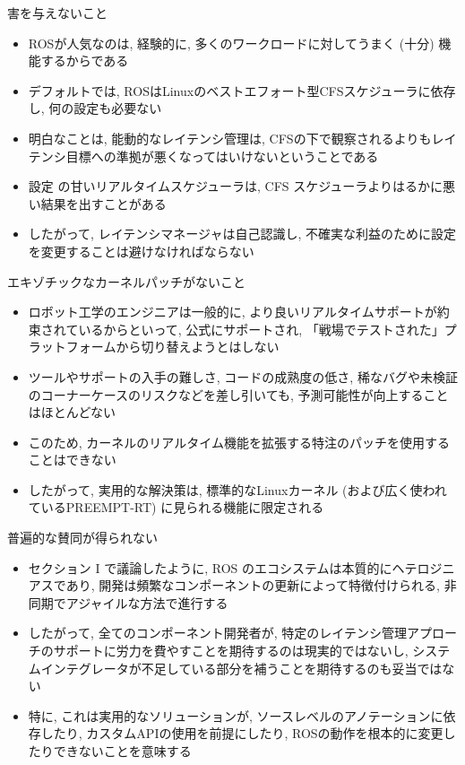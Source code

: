 \begin{frame}{害を与えないこと}
    \begin{itemize}
        \item ROSが人気なのは, 経験的に, 多くのワークロードに対してうまく (十分) 機能するからである
        \item デフォルトでは, ROSはLinuxのベストエフォート型CFSスケジューラに依存し, 何の設定も必要ない
        \item 明白なことは, 能動的なレイテンシ管理は, CFSの下で観察されるよりもレイテンシ目標への準拠が悪くなってはいけないということである
        \item 設定 の甘いリアルタイムスケジューラは, CFS スケジューラよりはるかに悪い結果を出すことがある
        \item したがって, レイテンシマネージャは自己認識し, 不確実な利益のために設定を変更することは避けなければならない
    \end{itemize}
\end{frame}

\begin{frame}{エキゾチックなカーネルパッチがないこと}
    \begin{itemize}
        \item ロボット工学のエンジニアは一般的に, より良いリアルタイムサポートが約束されているからといって, 公式にサポートされ, 「戦場でテストされた」プラットフォームから切り替えようとはしない
        \item ツールやサポートの入手の難しさ, コードの成熟度の低さ, 稀なバグや未検証のコーナーケースのリスクなどを差し引いても, 予測可能性が向上することはほとんどない
        \item このため, カーネルのリアルタイム機能を拡張する特注のパッチを使用することはできない
        \item したがって, 実用的な解決策は, 標準的なLinuxカーネル (および広く使われているPREEMPT-RT) に見られる機能に限定される
    \end{itemize}
\end{frame}

\begin{frame}{普遍的な賛同が得られない}
    \begin{itemize}
        \item セクション I で議論したように, ROS のエコシステムは本質的にヘテロジニアスであり, 開発は頻繁なコンポーネントの更新によって特徴付けられる, 非同期でアジャイルな方法で進行する
        \item したがって, 全てのコンポーネント開発者が, 特定のレイテンシ管理アプローチのサポートに労力を費やすことを期待するのは現実的ではないし, システムインテグレータが不足している部分を補うことを期待するのも妥当ではない
        \item 特に, これは実用的なソリューションが, ソースレベルのアノテーションに依存したり, カスタムAPIの使用を前提にしたり, ROSの動作を根本的に変更したりできないことを意味する
    \end{itemize}
\end{frame}


